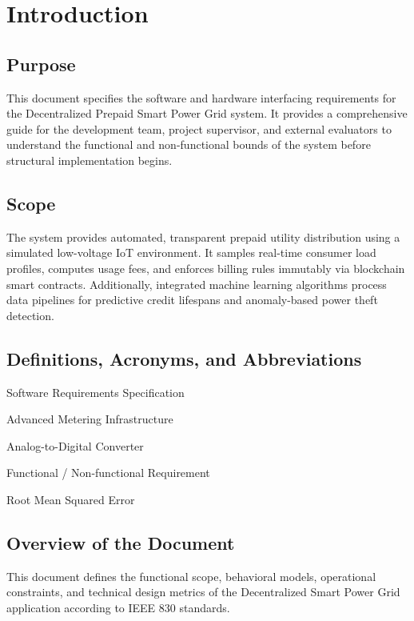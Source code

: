 \section{Introduction}

\subsection{Purpose}
This document specifies the software and hardware interfacing requirements for the Decentralized Prepaid Smart Power Grid system. It provides a comprehensive guide for the development team, project supervisor, and external evaluators to understand the functional and non-functional bounds of the system before structural implementation begins.

\subsection{Scope}
The system provides automated, transparent prepaid utility distribution using a simulated low-voltage IoT environment. It samples real-time consumer load profiles, computes usage fees, and enforces billing rules immutably via blockchain smart contracts. Additionally, integrated machine learning algorithms process data pipelines for predictive credit lifespans and anomaly-based power theft detection.

\subsection{Definitions, Acronyms, and Abbreviations}
\begin{description}[leftmargin=2.5cm,style=nextline]
  \item[SRS] Software Requirements Specification
  \item[AMI] Advanced Metering Infrastructure
  \item[ADC] Analog-to-Digital Converter
  \item[FR / NFR] Functional / Non-functional Requirement
  \item[RMSE] Root Mean Squared Error
\end{description}

\subsection{Overview of the Document}
This document defines the functional scope, behavioral models, operational constraints, and technical design metrics of the Decentralized Smart Power Grid application according to IEEE 830 standards.
